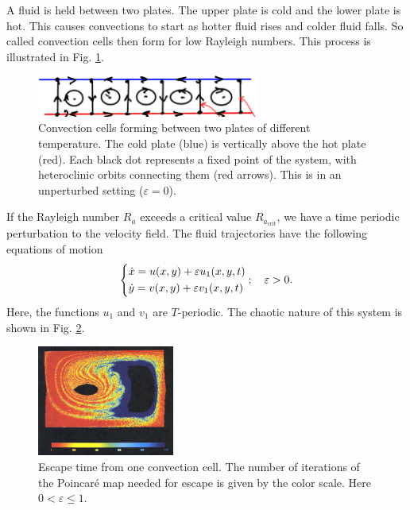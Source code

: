 \begin{ex}
	A fluid is held between two plates. The upper plate is cold and the lower plate is hot. This causes convections to start as hotter fluid rises and colder fluid falls. So called convection cells then form for low Rayleigh numbers. This process is illustrated in Fig. \ref{fig:convection_cells}.
	\begin{figure}[h!]
		\centering
		\includegraphics[width=0.65\textwidth]{figures/ch6/4convection_plates.png}
		\caption{Convection cells forming between two plates of different temperature. The cold plate (blue) is vertically above the hot plate (red). Each black dot represents a fixed point of the system, with heteroclinic orbits connecting them (red arrows). This is in an unperturbed setting ($\varepsilon =0 $).}
		\label{fig:convection_cells}
	\end{figure}

	If the Rayleigh number $R_{a}$ exceeds a critical value $R_{a_{ \textrm{crit} }}$, we have a time periodic perturbation to the velocity field. The fluid trajectories have the following equations of motion
	\begin{align}
		\begin{dcases}
			\dot{x} = u(x,y) + \varepsilon u_1(x,y,t) \\
			\dot{y} = v(x,y) + \varepsilon v_1 (x,y,t)
		\end{dcases}
;\quad \varepsilon>0.		
	\end{align}
	Here, the functions $u_1$ and $v_1$ are $T$-periodic. The chaotic nature of this system is shown in Fig. \ref{fig:convection_chaos}.
	\begin{figure}[h!]
		\centering
		\includegraphics[width=0.4\textwidth]{figures/ch6/5convection_chaos.png}
		\caption{Escape time from one convection cell. The number of iterations of the Poincaré map needed for escape is given by the color scale. Here $0 < \varepsilon \leq 1$.}
		\label{fig:convection_chaos}
	\end{figure}
	
\end{ex}

